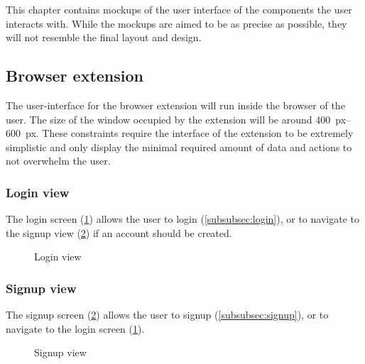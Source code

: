 This chapter contains mockups of the user interface of the components the user interacts with.
While the mockups are aimed to be as precise as possible, they will not resemble the final layout and design.

\subsection{Browser extension}\label{subsec:browser-extension}
The user-interface for the browser extension will run inside the browser of the user.
The size of the window occupied by the extension will be around \SI{400}{px}--\SI{600}{px}. \newline
These constraints require the interface of the extension to be extremely simplistic and only display the minimal required amount of data and actions to not overwhelm the user.

\subsubsection{Login view}
The login screen (\ref{fig:ex-login-view}) allows the user to login (\ref{subsubsec:login}), or to navigate to the signup view (\ref{fig:ex-signup-view}) if an account should be created.
\begin{figure}
    \centering

    \caption{Login view}
    \label{fig:ex-login-view}
\end{figure}

\subsubsection{Signup view}
The signup screen (\ref{fig:ex-signup-view}) allows the user to signup (\ref{subsubsec:signup}), or to navigate to the login screen (\ref{fig:ex-login-view}).
\begin{figure}
    \centering

    \caption{Signup view}
    \label{fig:ex-signup-view}
\end{figure}

